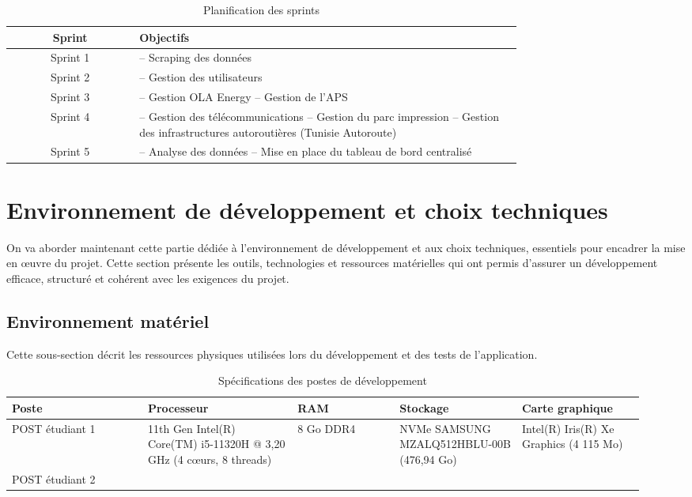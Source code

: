 \documentclass[a4paper,11pt]{report}
\begin{document}
\begin{table}[h]
\centering
\begin{tabular}{|c|p{0.75\linewidth}|}
\hline
\textbf{Sprint} & \textbf{Objectifs} \\
\hline
Sprint 1 & 
– Scraping des données \\
\hline
Sprint 2 & 
– Gestion des utilisateurs \\
\hline
Sprint 3 & 
– Gestion OLA Energy  
\newline – Gestion de l’APS \\
\hline
Sprint 4 & 
– Gestion des télécommunications  
\newline – Gestion du parc impression  
\newline – Gestion des infrastructures autoroutières (Tunisie Autoroute) \\
\hline
Sprint 5 & 
– Analyse des données  
\newline – Mise en place du tableau de bord centralisé \\
\hline
\end{tabular}
\caption{Planification des sprints}
\end{table}

\section{Environnement de développement et choix techniques}

On va aborder maintenant cette partie dédiée à l’environnement de développement et aux choix techniques, essentiels pour encadrer la mise en œuvre du projet. Cette section présente les outils, technologies et ressources matérielles qui ont permis d’assurer un développement efficace, structuré et cohérent avec les exigences du projet.

\subsection{Environnement matériel}

Cette sous-section décrit les ressources physiques utilisées lors du développement et des tests de l’application.

\begin{table}[h]
\centering
\renewcommand{\arraystretch}{1.3} %
\begin{tabular}{|p{0.2\linewidth}|p{0.22\linewidth}|p{0.15\linewidth}|p{0.18\linewidth}|p{0.18\linewidth}|}
\hline
\textbf{Poste} & \textbf{Processeur} & \textbf{RAM} & \textbf{Stockage} & \textbf{Carte graphique} \\
\hline
POST étudiant 1 & 11th Gen Intel(R) Core(TM) i5-11320H @ 3,20 GHz (4 cœurs, 8 threads) & 8 Go DDR4 & NVMe SAMSUNG MZALQ512HBLU-00B (476,94 Go) & Intel(R) Iris(R) Xe Graphics (4 115 Mo) \\

\hline
POST étudiant 2 \\
\hline
\end{tabular}
\caption{Spécifications des postes de développement}
\end{table}
\end{document}
